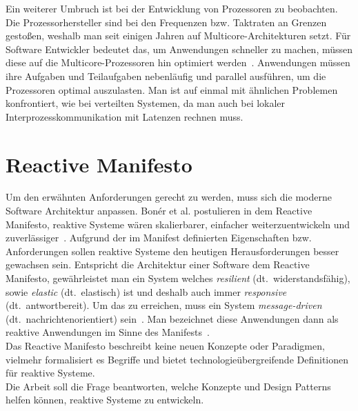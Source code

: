 
Ein weiterer Umbruch ist bei der Entwicklung von Prozessoren zu beobachten. Die Prozessorhersteller sind bei den Frequenzen bzw. Taktraten an Grenzen gestoßen, weshalb man seit einigen Jahren auf Multicore-Architekturen setzt. Für Software Entwickler bedeutet das, um Anwendungen schneller zu machen, müssen diese auf die Multicore-Prozessoren hin optimiert werden~\cite[S. 15]{butcher_seven_2014}. Anwendungen müssen ihre Aufgaben und Teilaufgaben nebenläufig und parallel ausführen, um die Prozessoren optimal auszulasten. Man ist auf einmal mit ähnlichen Problemen konfrontiert, wie bei verteilten Systemen, da man auch bei lokaler Interprozesskommunikation mit Latenzen rechnen muss.

\pagebreak

\section{Reactive Manifesto}
Um den erwähnten Anforderungen gerecht zu werden, muss sich die moderne Software Architektur anpassen. Bonér et al. postulieren in dem Reactive Manifesto, reaktive Systeme wären skalierbarer, einfacher weiterzuentwickeln und zuverlässiger~\cite{boner_reactive_2014}. Aufgrund der im Manifest definierten Eigenschaften bzw. Anforderungen sollen reaktive Systeme den heutigen Herausforderungen besser gewachsen sein. Entspricht die Architektur einer Software dem Reactive Manifesto, gewährleistet man ein System welches \textit{resilient} (dt.~widerstandsfähig), sowie \textit{elastic} (dt.~elastisch) ist und deshalb auch immer \textit{responsive} (dt.~antwortbereit). Um das zu erreichen, muss ein System \textit{message-driven} (dt.~nachrichtenorientiert) sein~\cite[S.~5]{vernon_reactive_2016}. Man bezeichnet diese Anwendungen dann als reaktive Anwendungen im Sinne des Manifests~\cite{boner_reactive_2014}.\\
Das Reactive Manifesto beschreibt keine neuen Konzepte oder Paradigmen, vielmehr formalisiert es Begriffe und bietet technologieübergreifende Definitionen für reaktive Systeme.\\

Die Arbeit soll die Frage beantworten, welche Konzepte und Design Patterns helfen können, reaktive Systeme zu entwickeln.
